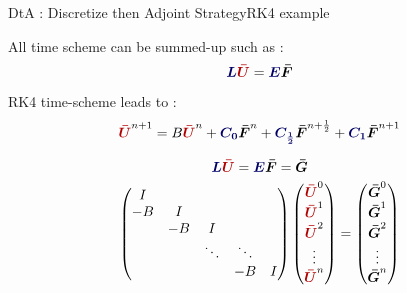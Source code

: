 \begin{frame}{DtA : Discretize then Adjoint Strategy}{RK4 example}

  All time scheme can be summed-up such as :
  \begin{equation}
    \textcolor{\myblue}{\boldsymbol{L}}\discreteU=\textcolor{\myblue}{\boldsymbol{E}}\discreteF
  \end{equation}

  \small
      RK4 time-scheme leads to :
    \begin{equation}
      \discreteU^{n+1}=B\discreteU^n+\textcolor{\myblue}{\boldsymbol{C_0}}\discreteF^n+\textcolor{\myblue}{\boldsymbol{C_{\frac{1}{2}}}}\discreteF^{n+\frac{1}{2}}+\textcolor{\myblue}{\boldsymbol{C_1}}\discreteF^{n+1}
    \end{equation}

\begin{equation}
  \textcolor{\myblue}{\boldsymbol{L}}\discreteU=\textcolor{\myblue}{\boldsymbol{E}}\discreteF=\discreteG
\end{equation}
\begin{equation}
  \begin{pmatrix}
    I & & & & \\
    -B&I & & & \\
    & -B&I  & & \\
    & & \ddots & \ddots   & \\
    & &  & -B &I \\
  \end{pmatrix}
    \begin{pmatrix}
    \discreteU^0 \\
    \discreteU^1 \\
    \discreteU^2 \\
    \vdots \\
    \discreteU^n \\
  \end{pmatrix}=
  \begin{pmatrix}
    \discreteG^0 \\
    \discreteG^1 \\
    \discreteG^2 \\
    \vdots \\
    \discreteG^n \\
  \end{pmatrix}
  \end{equation}
\end{frame}




